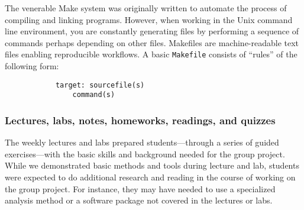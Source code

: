 
The venerable Make system was originally written to automate the process
of compiling and linking programs.
However, when working in the Unix command line environment, you are constantly
generating files by performing a sequence of commands perhaps depending on
other files.
Makefiles are machine-readable text files enabling reproducible workflows.
A basic \texttt{Makefile} consists of ``rules'' of the following form:
\begin{verbatim}
            target: sourcefile(s)
                command(s)
\end{verbatim}


\subsubsection{Lectures, labs, notes, homeworks, readings, and quizzes}

The weekly lectures and labs prepared students---through a
series of guided exercises---with the basic skills and
background needed for the group project.
While we demonstrated basic methods and tools during lecture and lab,
students were expected to do additional research and reading in the course
of working on the group project.
For instance, they may have needed to use a specialized analysis
method or a software package not covered in the lectures or labs.


